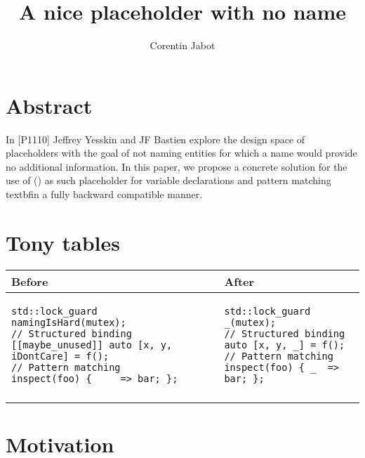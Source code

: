 \documentclass{wg21}
\title{A nice placeholder with no name}
\author{Corentin Jabot}{corentin.jabot@gmail.com}
\begin{document}
\maketitle


\section{Abstract}

In [P1110]\cite{P1110R0} Jeffrey Yesskin and JF Bastien explore the design space of placeholders
with the goal of not naming entities for which a name would provide no additional information.
In this paper, we propose a concrete solution for the use of \tcode{_} () as such placeholder 
for variable declarations and pattern matching textbf{in a fully backward compatible manner}.

\section{Tony tables}
\begin{center}
\begin{tabular}{l|l}
Before & After\\ \hline

\begin{minipage}[t]{0.5\textwidth}
\begin{lstlisting}[style=color]
std::lock_guard namingIsHard(mutex);
// Structured binding
[[maybe_unused]] auto [x, y, iDontCare] = f();
// Pattern matching
inspect(foo) { __  => bar; };

\end{lstlisting}
\end{minipage}
&
\begin{minipage}[t]{0.5\textwidth}
\begin{lstlisting}[style=color]
std::lock_guard _(mutex);
// Structured binding
auto [x, y, _] = f();
// Pattern matching
inspect(foo) { _  => bar; };

\end{lstlisting}
\end{minipage}
\\\\ \hline

\end{tabular}
\end{center}


\section{Motivation}
\end{document}
